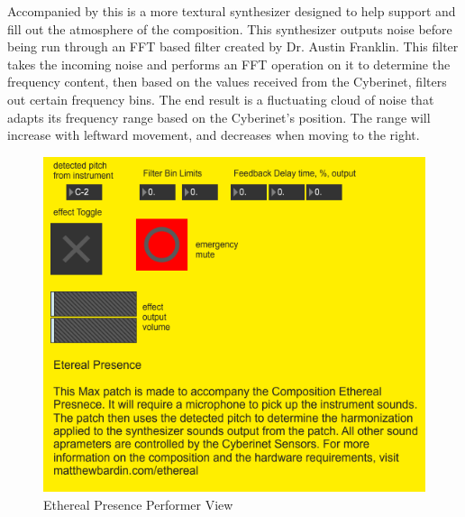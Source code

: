 Accompanied by this is a more textural synthesizer designed to help support and fill out the atmosphere of the composition. This synthesizer outputs noise before being run through an FFT based filter created by Dr. Austin Franklin. This filter takes the incoming noise and performs an FFT operation on it to determine the frequency content, then based on the values received from the Cyberinet, filters out certain frequency bins. The end result is a fluctuating cloud of noise that adapts its frequency range based on the Cyberinet's position. The range will increase with leftward movement, and decreases when moving to the right.


\begin{figure}
    \centering
    \includegraphics{diagrams/maxPatches/ethereal_pres.png}
    \caption{Ethereal Presence Performer View}
    \label{fig:etherealPerf}
\end{figure}

